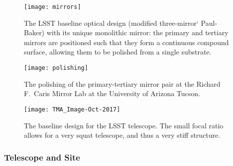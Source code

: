 \begin{figure}
\texttt{[image: mirrors]}
\caption{The LSST baseline optical design (modified three-mirror`
  Paul-Baker) with its unique
monolithic mirror: the primary and tertiary mirrors are positioned such
that they form a continuous compound surface, allowing them to be polished
from a single substrate.}
\label{Fig:optics}
\end{figure}


\begin{figure}
\texttt{[image: polishing]}
\caption{The polishing of the primary-tertiary mirror pair at the Richard F.\ Caris Mirror Lab at the University of Arizona Tucson. }
\label{Fig:polishing}
\end{figure}




\begin{figure}
\texttt{[image: TMA\_Image-Oct-2017]}
\caption{The baseline design for the
LSST telescope.  The small focal ratio allows for a very squat
telescope, and thus a very stiff structure.  }
\label{Fig:telescope}
\end{figure}



\subsubsection{ Telescope and Site}

